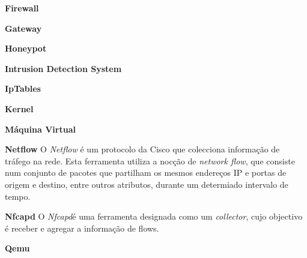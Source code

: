 \begin{description}
    \item \textbf{Firewall}
\end{description}

\begin{description}
    \item \textbf{Gateway}
\end{description}

\begin{description}
    \item \textbf{Honeypot}
\end{description}

\begin{description}
    \item \textbf{Intrusion Detection System}
\end{description}

\begin{description}
    \item \textbf{IpTables}
\end{description}

\begin{description}
    \item \textbf{Kernel}
\end{description}

\begin{description}
    \item \textbf{Máquina Virtual}
\end{description}

\begin{description}
    \item \textbf{Netflow}
O \textit{Netflow} é um protocolo da Cisco que colecciona informação de tráfego na rede. Esta ferramenta utiliza a nocção de \textit{network flow}, que consiste num conjunto de pacotes que partilham os mesmos endereços IP e portas de origem e destino, entre outros atributos, durante um determiado intervalo de tempo. 
\end{description}

\begin{description}
    \item \textbf{Nfcapd}
O \textit{Nfcapd}é uma ferramenta designada como um \textit{collector}, cujo objectivo é receber e agregar a informação de flows.
\end{description}

\begin{description}
    \item \textbf{Qemu}
\end{description}

